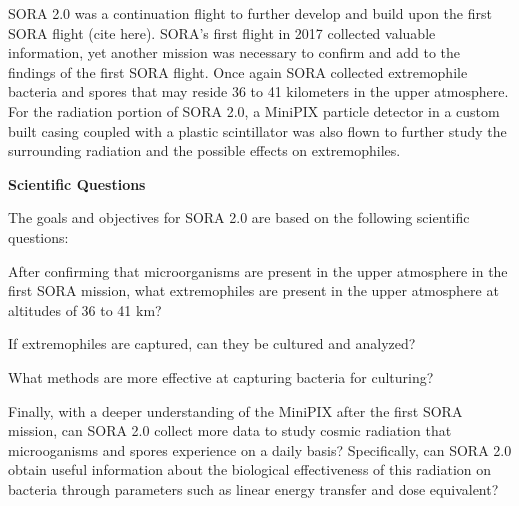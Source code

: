 SORA 2.0 was a continuation flight to further develop and build upon the first SORA flight (cite here).  SORA's first flight in 2017 collected valuable information, yet another mission was necessary to confirm and add to the findings of the first SORA flight.  Once again SORA collected extremophile bacteria and spores that may reside 36 to 41 kilometers in the upper atmosphere.  For the radiation portion of SORA 2.0, a MiniPIX particle detector in a custom built casing coupled with a plastic scintillator was also flown to further study the surrounding radiation and the possible effects on extremophiles.  
 
{\bf Scientific Questions}

The goals and objectives for SORA 2.0 are based on the following scientific questions: 
%
\begin{itemize}
	{\indentitem \item After confirming that microorganisms are present in the upper atmosphere in the first SORA mission, what extremophiles are present in the upper atmosphere at altitudes of 36 to 41 km?}
	{\indentitem \item If extremophiles are captured, can they be cultured and analyzed?}
	{\indentitem \item What methods are more effective at capturing bacteria for culturing?} 
	{\indentitem \item Finally, with a deeper understanding of the MiniPIX after the first SORA mission, can SORA 2.0 collect more data to study cosmic radiation that microoganisms and spores experience on a daily basis? Specifically, can SORA 2.0 obtain useful information about the biological effectiveness of this radiation on bacteria through parameters such as linear energy transfer and dose equivalent?}
\end{itemize}
%


